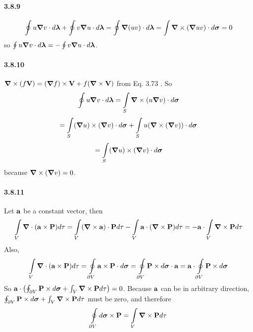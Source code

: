\documentclass[a4paper]{article}
\begin{document}
\paragraph{3.8.9}
\[
\oint u\boldsymbol{\nabla} v\cdot d\boldsymbol{\lambda}+\oint v\boldsymbol{\nabla} u\cdot d\boldsymbol{\lambda}
=\oint\boldsymbol{\nabla}(uv)\cdot d\boldsymbol{\lambda}
=\int\boldsymbol{\nabla}\times(\boldsymbol{\nabla}{uv})\cdot d\boldsymbol{\sigma}=0
\]
so $\oint u\boldsymbol{\nabla} v\cdot d\boldsymbol{\lambda}=-\oint v\boldsymbol{\nabla} u\cdot d\boldsymbol{\lambda}$.

\paragraph{3.8.10}
$\boldsymbol{\nabla}\times(f\mathbf{V})=(\boldsymbol{\nabla} f)\times\mathbf{V}+f(\boldsymbol{\nabla}\times\mathbf{V})$ from Eq. 3.73 . So
\[
\oint u\boldsymbol{\nabla} v\cdot d\boldsymbol{\lambda}=\int\displaylimits_S\boldsymbol{\nabla}\times(u\boldsymbol{\nabla} v)\cdot d\boldsymbol{\sigma}
\]
\[
=\int\displaylimits_S(\boldsymbol{\nabla} u)\times(\boldsymbol{\nabla} v)\cdot d\boldsymbol{\sigma}+\int\displaylimits_S u(\boldsymbol{\nabla}\times(\boldsymbol{\nabla} v))\cdot d\boldsymbol{\sigma}
\]
\[
=\int\displaylimits_S(\boldsymbol{\nabla} u)\times(\boldsymbol{\nabla} v)\cdot d\boldsymbol{\sigma}
\]
because $\boldsymbol{\nabla}\times(\boldsymbol{\nabla} v)=0$.

\paragraph{3.8.11}
Let $\mathbf{a}$ be a constant vector, then
\[
\int\displaylimits_V\boldsymbol{\nabla}\cdot(\mathbf{a}\times\mathbf{P})d\tau=\int\displaylimits_V(\boldsymbol{\nabla}\times\mathbf{a})\cdot\mathbf{P} d\tau-\int\displaylimits_V\mathbf{a}\cdot(\boldsymbol{\nabla}\times\mathbf{P})d\tau=-\mathbf{a}\cdot\int\displaylimits_V\boldsymbol{\nabla}\times\mathbf{P}d\tau
\]
Also, 
\[
\int\displaylimits_V\boldsymbol{\nabla}\cdot(\mathbf{a}\times\mathbf{P})d\tau=\oint\displaylimits_{\partial V}\mathbf{a}\times\mathbf{P}\cdot d\boldsymbol{\sigma}=\oint\displaylimits_{\partial V}\mathbf{P}\times d\boldsymbol{\sigma}\cdot\mathbf{a}=\mathbf{a}\cdot\oint\displaylimits_{\partial V}\mathbf{P}\times d\boldsymbol{\sigma}
\]
So $\mathbf{a}\cdot\left(\oint\displaylimits_{\partial V}\mathbf{P}\times d\boldsymbol{\sigma}+\int\displaylimits_V\boldsymbol{\nabla}\times\mathbf{P}d\tau\right)=0$. Because $\mathbf{a}$ can be in arbitrary direction, $\oint\displaylimits_{\partial V}\mathbf{P}\times d\boldsymbol{\sigma}+\int\displaylimits_V\boldsymbol{\nabla}\times\mathbf{P}d\tau$ must be zero, and therefore \[\oint\displaylimits_{\partial V}d\boldsymbol{\sigma}\times\mathbf{P}=\int\displaylimits_V\boldsymbol{\nabla}\times\mathbf{P}d\tau\]
\end{document}
